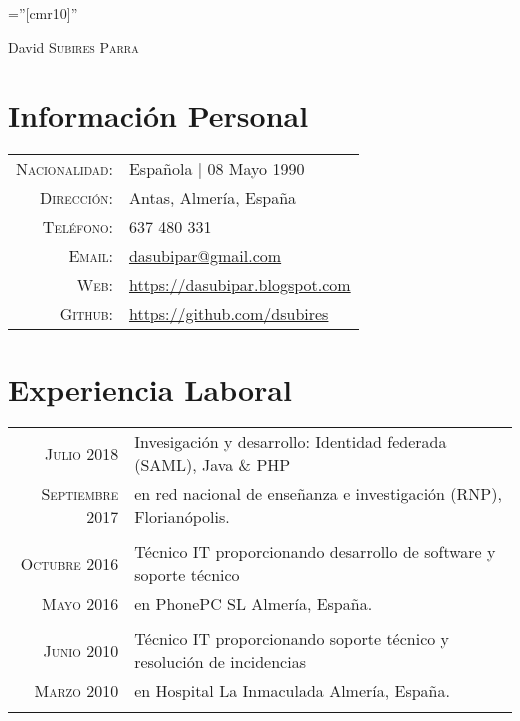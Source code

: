\documentclass[a4paper,10pt]{article}
\begin{document}
\pagestyle{empty} %

\font\fb=''[cmr10]'' %

\par{\centering
		{\Huge David \textsc{Subires Parra}
	}\bigskip\par}

\section*{Información Personal}

\begin{tabular}{rp{12cm}}
    \textsc{Nacionalidad:} & Española | 08 Mayo 1990 \\
    \textsc{Dirección:}     & Antas, Almería, España \\
    \textsc{Teléfono:}       &  637 480 331 \\
    \textsc{Email:}       & \href {mailto:dasubipar@gmail.com}{dasubipar@gmail.com} \\
    \textsc{Web:}     & \url {https://dasubipar.blogspot.com} \\
    \textsc{Github:}      & \url{https://github.com/dsubires}
\end{tabular}

\section*{Experiencia Laboral}
\begin{tabular}{r|p{11cm}}

\textsc {Julio 2018} & Invesigación y desarrollo: Identidad federada (SAML), Java \& PHP
\\\textsc{Septiembre 2017} & en red nacional de enseñanza e investigación (RNP), Florianópolis.  \normalsize \\\multicolumn{2}{c}{} \\



\textsc{Octubre} 2016 & Técnico IT proporcionando desarrollo de software y soporte técnico\\\textsc{Mayo 2016} & en PhonePC SL Almería, España. \normalsize \\\multicolumn{2}{c}{} \\


\textsc{Junio} 2010 & Técnico IT proporcionando soporte técnico y resolución de incidencias\\\textsc{Marzo 2010} & en Hospital La Inmaculada Almería, España. \normalsize \\\multicolumn{2}{c}{} \\


\end{tabular}
\end{document}
